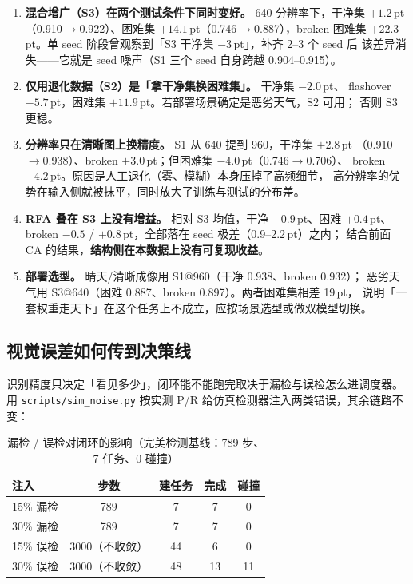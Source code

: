 \documentclass[UTF8,a4paper,11pt]{ctexart}
\begin{document}
\begin{enumerate}[label=(\arabic*)]
  \item \textbf{混合增广（S3）在两个测试条件下同时变好。} 640 分辨率下，干净集 $+1.2$\,pt
        （0.910$\to$0.922）、困难集 $+14.1$\,pt（0.746$\to$0.887），broken 困难集
        $+22.3$\,pt。单 seed 阶段曾观察到「S3 干净集 $-3$\,pt」，补齐 2--3 个 seed 后
        该差异消失——它就是 seed 噪声（S1 三个 seed 自身跨越 0.904--0.915）。
  \item \textbf{仅用退化数据（S2）是「拿干净集换困难集」。} 干净集 $-2.0$\,pt、
        flashover $-5.7$\,pt，困难集 $+11.9$\,pt。若部署场景确定是恶劣天气，S2 可用；
        否则 S3 更稳。
  \item \textbf{分辨率只在清晰图上换精度。} S1 从 640 提到 960，干净集 $+2.8$\,pt
        （0.910$\to$0.938）、broken $+3.0$\,pt；但困难集 $-4.0$\,pt（0.746$\to$0.706）、
        broken $-4.2$\,pt。原因是人工退化（雾、模糊）本身压掉了高频细节，
        高分辨率的优势在输入侧就被抹平，同时放大了训练与测试的分布差。
  \item \textbf{RFA 叠在 S3 上没有增益。} 相对 S3 均值，干净 $-0.9$\,pt、困难 $+0.4$\,pt、
        broken $-0.5$ / $+0.8$\,pt，全部落在 seed 极差（0.9--2.2\,pt）之内；
        结合前面 CA 的结果，\textbf{结构侧在本数据上没有可复现收益}。
  \item \textbf{部署选型。} 晴天/清晰成像用 S1@960（干净 0.938、broken 0.932）；
        恶劣天气用 S3@640（困难 0.887、broken 0.897）。两者困难集相差 19\,pt，
        说明「一套权重走天下」在这个任务上不成立，应按场景选型或做双模型切换。
\end{enumerate}

\subsection{视觉误差如何传到决策线}

识别精度只决定「看见多少」，闭环能不能跑完取决于漏检与误检怎么进调度器。用
\texttt{scripts/sim\_noise.py} 按实测 P/R 给仿真检测器注入两类错误，其余链路不变：

\begin{table}[htbp]
  \centering
  \caption{漏检 / 误检对闭环的影响（完美检测基线：789 步、7 任务、0 碰撞）}
  \label{tab:noise}
  \begin{tabular}{lcccc}
    \toprule
    注入 & 步数 & 建任务 & 完成 & 碰撞 \\
    \midrule
    15\% 漏检 & 789 & 7 & 7 & 0 \\
    30\% 漏检 & 789 & 7 & 7 & 0 \\
    15\% 误检 & 3000（不收敛） & 44 & 6 & 0 \\
    30\% 误检 & 3000（不收敛） & 48 & 13 & 11 \\
    \bottomrule
  \end{tabular}
\end{table}
\end{document}
